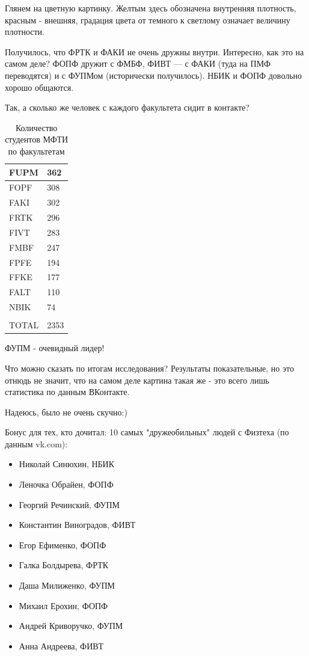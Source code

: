 \documentclass{article}
\begin{document}
Глянем на цветную картинку. Желтым здесь обозначена внутренняя плотность, красным - внешняя, градация цвета от темного к
светлому означает величину плотности.

Получилось, что ФРТК и ФАКИ не очень дружны внутри. Интересно, как это на самом деле? ФОПФ дружит с ФМБФ, ФИВТ --- с ФАКИ (туда на ПМФ
переводятся) и с ФУПМом (исторически получилось). НБИК и ФОПФ довольно хорошо общаются.

\newpage

Так, а сколько же человек с каждого факультета сидит в контакте?

\begin{table}[ht]
\caption{Количество студентов МФТИ по факультетам}
\begin{center}
\begin{tabular}{|l|l|}
\hline
FUPM & 362 \\ \hline
FOPF & 308 \\ \hline
FAKI & 302 \\ \hline
FRTK & 296 \\ \hline
FIVT & 283 \\ \hline
FMBF & 247 \\ \hline
FPFE & 194 \\ \hline
FFKE & 177 \\ \hline
FALT & 110 \\ \hline
NBIK & 74  \\ \hline
     &     \\ \hline
TOTAL & 2353 \\ \hline
\end{tabular}
\end{center}
\end{table}

ФУПМ - очевидный лидер!

Что можно сказать по итогам исследования? Результаты показательные, но это отнюдь не значит, что на самом деле картина такая же - это всего
лишь статистика по данным ВКонтакте.

Надеюсь, было не очень скучно:)

Бонус для тех, кто дочитал: 10 самых "дружеобильных" людей с Физтеха (по данным vk.com):
\begin{itemize}
    \item Николай Синюхин, НБИК
    \item Леночка Обрайен, ФОПФ
    \item Георгий Речинский, ФУПМ
    \item Константин Виноградов, ФИВТ
    \item Егор Ефименко, ФОПФ
    \item Галка Болдырева, ФРТК
    \item Даша Милиженко, ФУПМ
    \item Михаил Ерохин, ФОПФ
    \item Андрей Криворучко, ФУПМ
    \item Анна Андреева, ФИВТ
\end{itemize}
\end{document}
